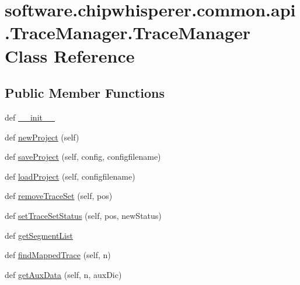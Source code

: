 \hypertarget{classsoftware_1_1chipwhisperer_1_1common_1_1api_1_1TraceManager_1_1TraceManager}{}\section{software.\+chipwhisperer.\+common.\+api.\+Trace\+Manager.\+Trace\+Manager Class Reference}
\label{classsoftware_1_1chipwhisperer_1_1common_1_1api_1_1TraceManager_1_1TraceManager}
\subsection*{Public Member Functions}
\begin{DoxyCompactItemize}
\item 
def \hyperlink{classsoftware_1_1chipwhisperer_1_1common_1_1api_1_1TraceManager_1_1TraceManager_ae884c3326fe9d0168d29e717538ad3ae}{\+\_\+\+\_\+init\+\_\+\+\_\+}
\item 
def \hyperlink{classsoftware_1_1chipwhisperer_1_1common_1_1api_1_1TraceManager_1_1TraceManager_ac023c852ceb0e0430b4eb2376b6ebc34}{new\+Project} (self)
\item 
def \hyperlink{classsoftware_1_1chipwhisperer_1_1common_1_1api_1_1TraceManager_1_1TraceManager_a0036b263bb093b6a5e006021ee54176f}{save\+Project} (self, config, configfilename)
\item 
def \hyperlink{classsoftware_1_1chipwhisperer_1_1common_1_1api_1_1TraceManager_1_1TraceManager_a0471625afb023973dae8f0bfbaeaec50}{load\+Project} (self, configfilename)
\item 
def \hyperlink{classsoftware_1_1chipwhisperer_1_1common_1_1api_1_1TraceManager_1_1TraceManager_abf750208d9d6d0dd9d5936d26d1fc676}{remove\+Trace\+Set} (self, pos)
\item 
def \hyperlink{classsoftware_1_1chipwhisperer_1_1common_1_1api_1_1TraceManager_1_1TraceManager_a340fce499c02e11db6a809d0796840f4}{set\+Trace\+Set\+Status} (self, pos, new\+Status)
\item 
def \hyperlink{classsoftware_1_1chipwhisperer_1_1common_1_1api_1_1TraceManager_1_1TraceManager_abcd793c60e7c199dc13b772868cd908a}{get\+Segment\+List}
\item 
def \hyperlink{classsoftware_1_1chipwhisperer_1_1common_1_1api_1_1TraceManager_1_1TraceManager_a9d5742a02ec11dc24b0895a04caedc8c}{find\+Mapped\+Trace} (self, n)
\item 
def \hyperlink{classsoftware_1_1chipwhisperer_1_1common_1_1api_1_1TraceManager_1_1TraceManager_adad8d76a395001af41fef11bcee0930f}{get\+Aux\+Data} (self, n, aux\+Dic)

\end{DoxyCompactItemize}
